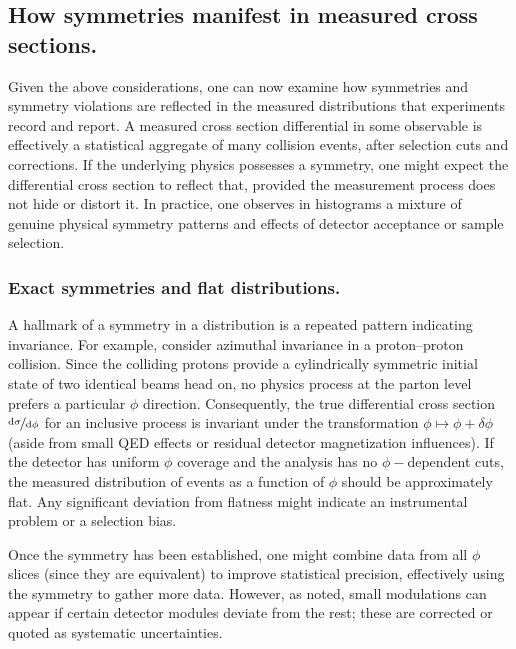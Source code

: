     \subsection{How symmetries manifest in measured cross sections.}
    \label{subsec:cross-section-symmetries}
        Given the above considerations, one can now examine how symmetries and symmetry violations are reflected in the measured distributions that experiments record and report.
        A measured cross section differential in some observable is effectively a statistical aggregate of many collision events, after selection cuts and corrections.
        If the underlying physics possesses a symmetry, one might expect the differential cross section to reflect that, provided the measurement process does not hide or distort it.
        In practice, one observes in histograms a mixture of genuine physical symmetry patterns and effects of detector acceptance or sample selection.

        \subsubsection{Exact symmetries and flat distributions.}
            A hallmark of a symmetry in a distribution is a repeated pattern indicating invariance.
            For example, consider azimuthal invariance in a proton--proton collision.
            Since the colliding protons provide a cylindrically symmetric initial state of two identical beams head on, no physics process at the parton level prefers a particular $\phi$ direction.
            Consequently, the true differential cross section $\nicefrac{\dd\sigma}{\dd\phi}$ for an inclusive process is invariant under the transformation $\phi\mapsto\phi+\delta\phi$ (aside from small QED effects or residual detector magnetization influences).
            If the detector has uniform $\phi$ coverage and the analysis has no $\phi-$dependent cuts, the measured distribution of events as a function of $\phi$ should be approximately flat.
            Any significant deviation from flatness might indicate an instrumental problem or a selection bias.
            
            Once the symmetry has been established, one might combine data from all $\phi$ slices (since they are equivalent) to improve statistical precision, effectively using the symmetry to gather more data.
            However, as noted, small modulations can appear if certain detector modules deviate from the rest; these are corrected or quoted as systematic uncertainties.

